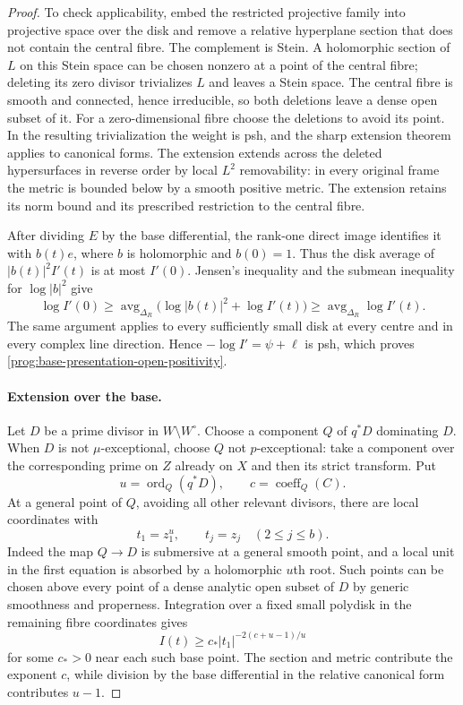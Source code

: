 \begin{proof}
To check applicability, embed the restricted projective family into
projective space over the disk and remove a relative hyperplane
section that does not contain the central fibre. The complement is
Stein. A holomorphic section of $L$ on this Stein space can be chosen
nonzero at a point of the central fibre; deleting its zero divisor
trivializes $L$ and leaves a Stein space. The central fibre is smooth
and connected, hence irreducible, so both deletions leave a dense
open subset of it. For a zero-dimensional fibre choose the deletions
to avoid its point. In the resulting trivialization the weight is
psh, and the sharp extension theorem applies to canonical forms.
The extension extends across the deleted hypersurfaces in reverse
order by local $L^2$ removability: in every original frame the metric
is bounded below by a smooth positive metric. The extension retains
its norm bound and its prescribed restriction to the central fibre.

After dividing $E$ by the base differential, the rank-one direct
image identifies it with $b(t)e$, where $b$ is holomorphic and
$b(0)=1$. Thus the disk average of $|b(t)|^2I'(t)$ is at most $I'(0)$.
Jensen's inequality and the submean inequality for $\log|b|^2$ give
\[
 \log I'(0)
 \geq\operatorname{avg}_{\Delta_R}
             \bigl(\log|b(t)|^2+\log I'(t)\bigr)
 \geq\operatorname{avg}_{\Delta_R}\log I'(t).
\]
The same argument applies to every sufficiently small disk at every
centre and in every complex line direction. Hence $-\log I'=\psi+\ell$ is psh, which proves
\eqref{prog:base-presentation-open-positivity}.

\paragraph{Extension over the base.}
Let $D$ be a prime divisor in $W\setminus W^\circ$. Choose a component
$Q$ of $q^*D$ dominating $D$. When $D$ is not $\mu$-exceptional, choose
$Q$ not $p$-exceptional: take a component over the corresponding prime
on $Z$ already on $X$ and then its strict transform. Put
\[
 u=\operatorname{ord}_Q(q^*D),\qquad c=\operatorname{coeff}_Q(C).
\]
At a general point of $Q$, avoiding all other relevant divisors,
there are local coordinates with
\[
 t_1=z_1^u,\qquad t_j=z_j\quad(2\leq j\leq b).
\]
Indeed the map $Q\to D$ is submersive at a general smooth point,
and a local unit in the first equation is absorbed by a holomorphic
$u$th root. Such points can be chosen above every point of a dense
analytic open subset of $D$ by generic smoothness and properness.
Integration over a fixed small polydisk in the remaining fibre
coordinates gives
\begin{equation}\label{prog:base-presentation-divisor-bound}
 I(t)\geq c_*|t_1|^{-2(c+u-1)/u}
\end{equation}
for some $c_*>0$ near each such base point. The section and metric
contribute the exponent $c$, while division by the base differential
in the relative canonical form contributes $u-1$.


\end{proof}
